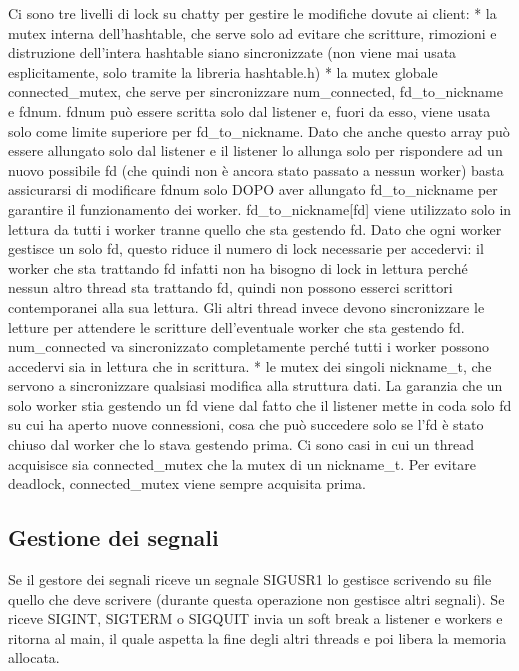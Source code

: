 \documentclass[a4paper]{article}
\theoremstyle{theorem}
\theoremstyle{remark}
\theoremstyle{definition}
\theoremstyle{corollary}
\theoremstyle{lemma}
\begin{document}
Ci sono tre livelli di lock su chatty per gestire le modifiche dovute ai client:
* la mutex interna dell'hashtable, che serve solo ad evitare che scritture,
rimozioni e distruzione dell'intera hashtable siano sincronizzate (non viene
mai usata esplicitamente, solo tramite la libreria hashtable.h)
* la mutex globale connected\_mutex, che serve per sincronizzare num\_connected,
fd\_to\_nickname e fdnum.
fdnum può essere scritta solo dal listener e, fuori da esso, viene usata solo
come limite superiore per fd\_to\_nickname. Dato che anche questo array può
essere allungato solo dal listener e il listener lo allunga solo per
rispondere ad un nuovo possibile fd (che quindi non è ancora stato passato a
nessun worker) basta assicurarsi di modificare fdnum solo DOPO aver allungato
fd\_to\_nickname per garantire il funzionamento dei worker.
fd\_to\_nickname[fd] viene utilizzato solo in lettura da tutti i worker tranne
quello che sta gestendo fd. Dato che ogni worker gestisce un solo fd, questo
riduce il numero di lock necessarie per accedervi: il worker che sta trattando
fd infatti non ha bisogno di lock in lettura perché nessun altro thread sta
trattando fd, quindi non possono esserci scrittori contemporanei alla sua
lettura. Gli altri thread invece devono sincronizzare le letture per attendere
le scritture dell'eventuale worker che sta gestendo fd.
num\_connected va sincronizzato completamente perché tutti i worker possono
accedervi sia in lettura che in scrittura.
* le mutex dei singoli nickname\_t, che servono a sincronizzare qualsiasi modifica
alla struttura dati.
La garanzia che un solo worker stia gestendo un fd viene dal fatto che il
listener mette in coda solo fd su cui ha aperto nuove connessioni, cosa che può
succedere solo se l'fd è stato chiuso dal worker che lo stava gestendo prima.
Ci sono casi in cui un thread acquisisce sia connected\_mutex che la mutex di un
nickname\_t. Per evitare deadlock, connected\_mutex viene sempre acquisita prima.

\subsection{Gestione dei segnali}\label{gestione-segnali}
Se il gestore dei segnali riceve un segnale SIGUSR1 lo gestisce scrivendo su file
quello che deve scrivere (durante questa operazione non gestisce altri segnali).
Se riceve SIGINT, SIGTERM o SIGQUIT invia un soft break a listener e workers e
ritorna al main, il quale aspetta la fine degli altri threads e poi libera la
memoria allocata.
\end{document}
